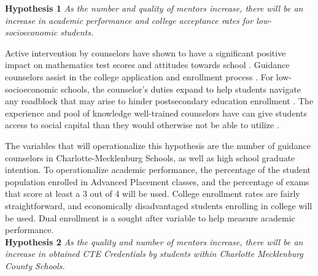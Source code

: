 \textbf{Hypothesis 1} \textit{As the number and quality of mentors increase, there will be an increase in academic performance and college acceptance rates for low-socioeconomic students.}

Active intervention by counselors have shown to have a significant positive impact on mathematics test scores and attitudes towards school \parencite[][]{lee1993}. 
Guidance counselors assist in the college application and enrollment process \parencite[][]{deslonde2018high,tang2019high}.
For low-socioeconomic schools, the counselor's duties expand to help students navigate any roadblock that may arise to hinder postsecondary education enrollment \parencite{farmer2006, deslonde2018high}. 
The experience and pool of knowledge well-trained counselors have can give students access to social capital than they would otherwise not be able to utilize \parencite{tang2019high}.

The variables that will operationalize this hypothesis are the number of guidance counselors in Charlotte-Mecklenburg Schools, as well as high school graduate intention. 
To operationalize academic performance, the percentage of the student population enrolled in Advanced Placement classes, and the percentage of exams that score at least a 3 out of 4 will be used. 
College enrollment rates are fairly straightforward, and economically disadvantaged students enrolling in college will be used. Dual enrollment is a sought after variable to help measure academic performance. 
\\


\textbf{Hypothesis 2} \textit{As the quality and number of mentors increase, there will be an increase in obtained CTE Credentials by students within Charlotte Mecklenburg County Schools.}

